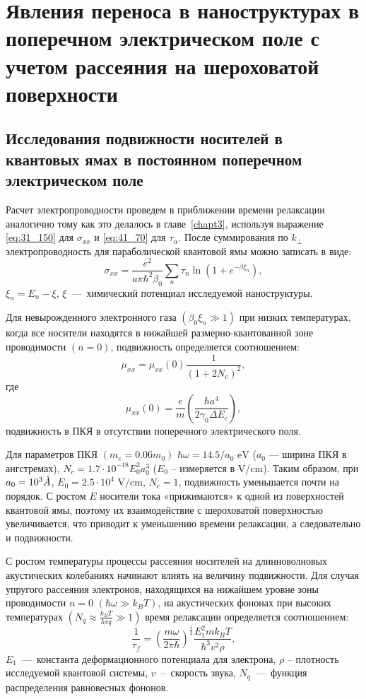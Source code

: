 \chapter{Явления переноса в наноструктурах в поперечном электрическом поле с учетом рассеяния на шероховатой поверхности} \label{chapt4}

\section{Исследования подвижности носителей в квантовых ямах в постоянном поперечном электрическом поле} \label{sect4_1}

Расчет электропроводности проведем в приближении времени релаксации аналогично тому как это делалось в главе~\ref{chapt3}, используя выражение \eqref{eq:31_150} для $\sigma_{xx}$ и \eqref{eq:41_70} для $\tau_{\alpha}$.
После суммирования по $k_{\bot } $ электропроводность для параболической квантовой ямы можно записать в виде:
\begin{equation} \label{eq:41_80}
	\sigma_{xx} =\frac{e^2 }{a\pi \hbar^2 \beta_0 } \sum_n\tau_n \ln \left(1+e^{-\beta \xi_n } \right),
\end{equation}
$\xi_n =E_n -\xi$, $\xi $~---~химический потенциал исследуемой наноструктуры.

Для невырожденного электронного газа $(\beta_0 \xi_n \gg 1)$ при низких температурах, когда все носители находятся в нижайшей размерно-квантованной зоне проводимости $(n=0)$, подвижность определяется соотношением:
\begin{equation} \label{eq:41_90}
	\mu_{xx} =\mu_{xx}(0)\frac{1}{\left(1+2 N_c \right)^2 } ,
\end{equation}
где
\[
	\mu_{xx}(0)=\frac{e}{m} \left(\frac{\hbar a^4 }{2\gamma_0 \Delta E_c } \right),
\]
подвижность в ПКЯ в отсутствии поперечного электрического поля.

Для параметров ПКЯ $(m_e = 0.06 m_0 )$ $\hbar \omega = 14.5/a_0 \text{ eV}$ ($a_0 $ --- ширина ПКЯ в ангстремах), $N_c =1.7\cdot 10^{-18} E_0^2 a_0^3 $ ($E_0 $ -- измеряется в V/cm). Таким образом, при $a_0 = 10^3 \AA$, $E_0 = 2.5\cdot 10^4 \text{ V/cm}$, $N_c =1$, подвижность уменьшается почти на порядок. С ростом $E$ носители тока «прижимаются» к одной из поверхностей квантовой ямы, поэтому их взаимодействие с шероховатой поверхностью увеличивается, что приводит к уменьшению времени релаксации, а следовательно и подвижности.

С ростом температуры процессы рассеяния носителей на длинноволновых акустических колебаниях начинают влиять на величину подвижности. Для случая упругого рассеяния электронов, находящихся на нижайшем уровне зоны проводимости $n=0$ $(\hbar \omega \gg k_B T)$, на акустических фононах при высоких температурах $(N_q \approx \frac{k_BT}{hvq} \gg 1)$ время релаксации определяется соотношением:
\begin{equation} \label{eq:41_100}
	\frac{1}{\tau _{f} } =\left(\frac{m\omega }{2\pi \hbar } \right)^{\frac{1}{2} } \frac{E_1^2 m k_B T}{\hbar^3 v^2 \rho } ,
\end{equation}
$E_1 $~---~константа деформационного потенциала для электрона, $\rho $ -- плотность исследуемой квантовой системы, $v$~--~скорость звука, $N_q $~---~функция распределения равновесных фононов.

